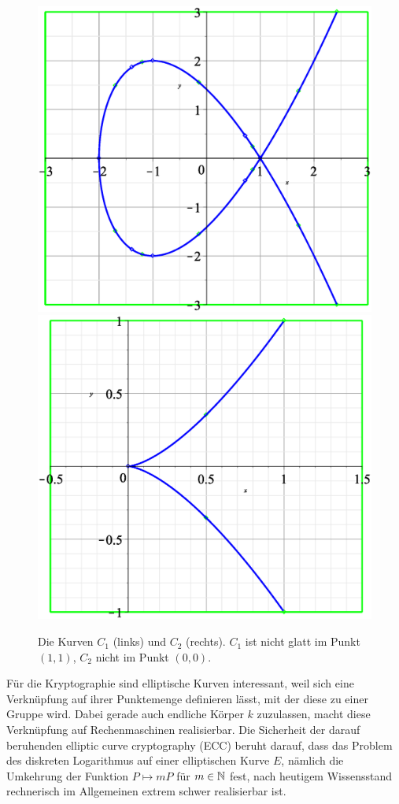 \begin{figure}[H]
	\centering
	\includegraphics[scale=.3]{img/curve_0_3.eps} \hspace{2cm}
	\includegraphics[scale=.3]{img/curve_0_4.eps}
	\caption{Die Kurven $C_1$ (links) und $C_2$ (rechts). $C_1$ ist nicht glatt im Punkt $(1,1)$, $C_2$ nicht im Punkt $(0,0)$.}
	\label{fig:bsp}
\end{figure}

Für die Kryptographie sind elliptische Kurven interessant, weil sich eine Verknüpfung auf ihrer Punktemenge definieren lässt, mit der diese zu einer Gruppe wird. 
Dabei gerade auch endliche Körper $k$ zuzulassen, macht diese Verknüpfung auf Rechenmaschinen realisierbar. 
Die Sicherheit der darauf beruhenden elliptic curve cryptography (ECC) beruht darauf, dass das Problem des diskreten Logarithmus auf einer elliptischen Kurve $E$, nämlich die Umkehrung der Funktion $P \mapsto mP$ für $m \in \mathbb{N}$ fest, nach heutigem Wissensstand rechnerisch im Allgemeinen extrem schwer realisierbar ist.
\newpage
